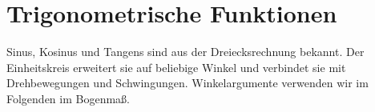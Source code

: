 \section{Trigonometrische Funktionen}
\label{sec:real_functions_trigonometric_functions}
Sinus, Kosinus und Tangens sind aus der Dreiecksrechnung bekannt.
Der Einheitskreis erweitert sie auf beliebige Winkel und verbindet sie
mit Drehbewegungen und Schwingungen. Winkelargumente verwenden wir
im Folgenden im Bogenmaß.



